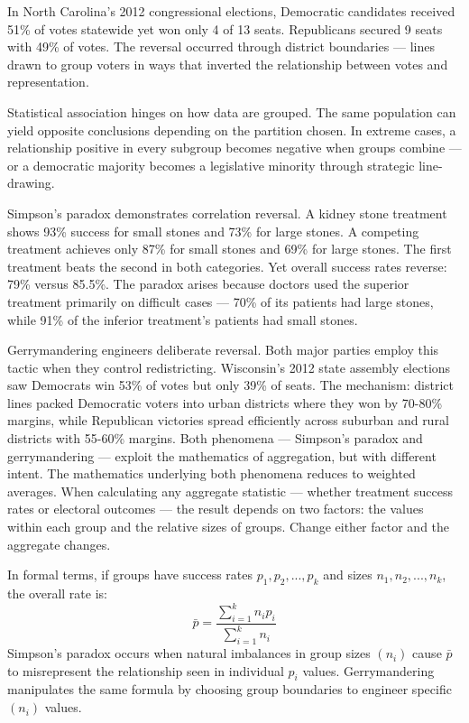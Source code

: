 In North Carolina's 2012 congressional elections, Democratic candidates received 51\% of votes statewide yet won only 4 of 13 seats. Republicans secured 9 seats with 49\% of votes. The reversal occurred through district boundaries — lines drawn to group voters in ways that inverted the relationship between votes and representation.

Statistical association hinges on how data are grouped. The same population can yield opposite conclusions depending on the partition chosen. In extreme cases, a relationship positive in every subgroup becomes negative when groups combine — or a democratic majority becomes a legislative minority through strategic line-drawing.

Simpson's paradox demonstrates correlation reversal. A kidney stone treatment shows 93\% success for small stones and 73\% for large stones. A competing treatment achieves only 87\% for small stones and 69\% for large stones. The first treatment beats the second in both categories. Yet overall success rates reverse: 79\% versus 85.5\%. The paradox arises because doctors used the superior treatment primarily on difficult cases — 70\% of its patients had large stones, while 91\% of the inferior treatment's patients had small stones.

Gerrymandering engineers deliberate reversal. Both major parties employ this tactic when they control redistricting. Wisconsin's 2012 state assembly elections saw Democrats win 53\% of votes but only 39\% of seats. The mechanism: district lines packed Democratic voters into urban districts where they won by 70-80\% margins, while Republican victories spread efficiently across suburban and rural districts with 55-60\% margins. Both phenomena — Simpson's paradox and gerrymandering — exploit the mathematics of aggregation, but with different intent. The mathematics underlying both phenomena reduces to weighted averages. When calculating any aggregate statistic — whether treatment success rates or electoral outcomes — the result depends on two factors: the values within each group and the relative sizes of groups. Change either factor and the aggregate changes.

In formal terms, if groups have success rates $p_1, p_2, ..., p_k$ and sizes $n_1, n_2, ..., n_k$, the overall rate is:
\[
\bar{p} = \frac{\sum_{i=1}^k n_i p_i}{\sum_{i=1}^k n_i}
\]
Simpson's paradox occurs when natural imbalances in group sizes $(n_i)$ cause $\bar{p}$ to misrepresent the relationship seen in individual $p_i$ values. Gerrymandering manipulates the same formula by choosing group boundaries to engineer specific $(n_i)$ values.

